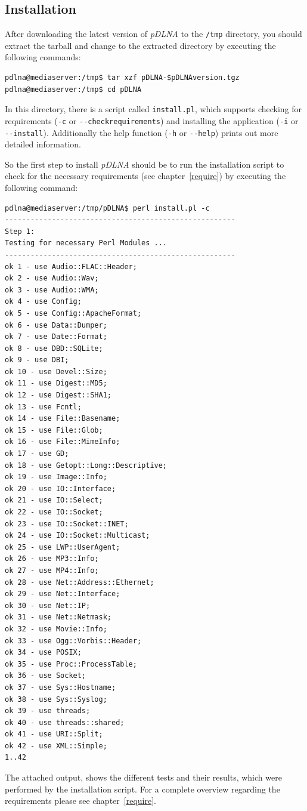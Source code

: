 \documentclass[a4paper,oneside,10pt]{report}
\newenvironment{colframecmd}{%
  \begin{Sbox}
    \begin{minipage}{.99\columnwidth}
}{%
  \end{minipage}
  \end{Sbox}
  \begin{center}
    \fcolorbox{black}{LightSteelBlue}{\TheSbox}
  \end{center}
}
\begin{document}
\subsection{Installation}

After downloading the latest version of {\em pDLNA} to the \verb|/tmp| directory, you should extract the tarball and change to the extracted directory by executing the following commands:
\begin{colframecmd}
\begin{verbatim}
pdlna@mediaserver:/tmp$ tar xzf pDLNA-$pDLNAversion.tgz
pdlna@mediaserver:/tmp$ cd pDLNA
\end{verbatim}
\end{colframecmd}

In this directory, there is a script called \verb|install.pl|, which supports checking for requirements (\verb|-c| or \verb|--checkrequirements|) and installing the application (\verb|-i| or \verb|--install|). Additionally the help function (\verb|-h| or \verb|--help|) prints out more detailed information.

So the first step to install {\em pDLNA} should be to run the installation script to check for the necessary requirements (see chapter~\ref{require}) by executing the following command:
\begin{colframecmd}
\begin{verbatim}
pdlna@mediaserver:/tmp/pDLNA$ perl install.pl -c
------------------------------------------------------
Step 1:
Testing for necessary Perl Modules ...
------------------------------------------------------
ok 1 - use Audio::FLAC::Header;
ok 2 - use Audio::Wav;
ok 3 - use Audio::WMA;
ok 4 - use Config;
ok 5 - use Config::ApacheFormat;
ok 6 - use Data::Dumper;
ok 7 - use Date::Format;
ok 8 - use DBD::SQLite;
ok 9 - use DBI;
ok 10 - use Devel::Size;
ok 11 - use Digest::MD5;
ok 12 - use Digest::SHA1;
ok 13 - use Fcntl;
ok 14 - use File::Basename;
ok 15 - use File::Glob;
ok 16 - use File::MimeInfo;
ok 17 - use GD;
ok 18 - use Getopt::Long::Descriptive;
ok 19 - use Image::Info;
ok 20 - use IO::Interface;
ok 21 - use IO::Select;
ok 22 - use IO::Socket;
ok 23 - use IO::Socket::INET;
ok 24 - use IO::Socket::Multicast;
ok 25 - use LWP::UserAgent;
ok 26 - use MP3::Info;
ok 27 - use MP4::Info;
ok 28 - use Net::Address::Ethernet;
ok 29 - use Net::Interface;
ok 30 - use Net::IP;
ok 31 - use Net::Netmask;
ok 32 - use Movie::Info;
ok 33 - use Ogg::Vorbis::Header;
ok 34 - use POSIX;
ok 35 - use Proc::ProcessTable;
ok 36 - use Socket;
ok 37 - use Sys::Hostname;
ok 38 - use Sys::Syslog;
ok 39 - use threads;
ok 40 - use threads::shared;
ok 41 - use URI::Split;
ok 42 - use XML::Simple;
1..42
\end{verbatim}
\end{colframecmd}
The attached output, shows the different tests and their results, which were performed by the installation script. For a complete overview regarding the requirements please see chapter~\ref{require}.
\end{document}

